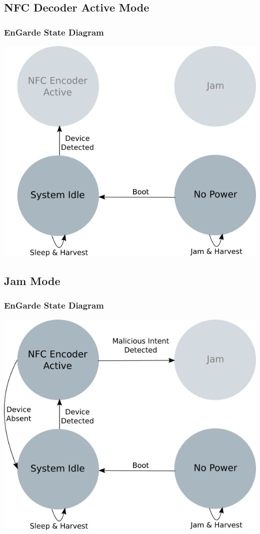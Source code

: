 \documentclass[unknownkeysallowed]{beamer}
\begin{document}
\subsection{NFC Decoder Active Mode}



\begin{frame}
\frametitle{EnGarde State Diagram}
\begin{center}
  \includegraphics[width=.8\linewidth,height=.7\textheight,keepaspectratio]{figures/engarde/states3.png}%
\end{center}
\end{frame}

\subsection{Jam Mode}
\begin{frame}
\frametitle{EnGarde State Diagram}
\begin{center}
  \includegraphics[width=.8\linewidth,height=.7\textheight,keepaspectratio]{figures/engarde/states4.png}
\end{center}
\end{frame}
\end{document}
